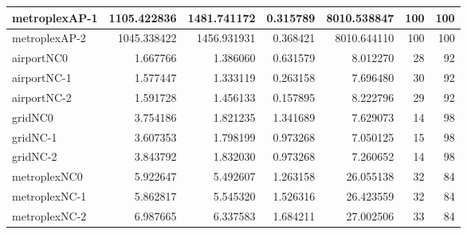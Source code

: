 \begin{longtable}{|l|r|r|r|r|r|r|}
metroplexAP-1 & 1105.422836 & 1481.741172 & 0.315789 & 8010.538847 & 100 & 100 \\ \hline
metroplexAP-2 & 1045.338422 & 1456.931931 & 0.368421 & 8010.644110 & 100 & 100 \\ \hline
airportNC0 & 1.667766 & 1.386060 & 0.631579 & 8.012270 & 28 & 92 \\ \hline
airportNC-1 & 1.577447 & 1.333119 & 0.263158 & 7.696480 & 30 & 92 \\ \hline
airportNC-2 & 1.591728 & 1.456133 & 0.157895 & 8.222796 & 29 & 92 \\ \hline
gridNC0 & 3.754186 & 1.821235 & 1.341689 & 7.629073 & 14 & 98 \\ \hline
gridNC-1 & 3.607353 & 1.798199 & 0.973268 & 7.050125 & 15 & 98 \\ \hline
gridNC-2 & 3.843792 & 1.832030 & 0.973268 & 7.260652 & 14 & 98 \\ \hline
metroplexNC0 & 5.922647 & 5.492607 & 1.263158 & 26.055138 & 32 & 84 \\ \hline
metroplexNC-1 & 5.862817 & 5.545320 & 1.526316 & 26.423559 & 32 & 84 \\ \hline
metroplexNC-2 & 6.987665 & 6.337583 & 1.684211 & 27.002506 & 33 & 84 \\ \hline
\end{longtable}
